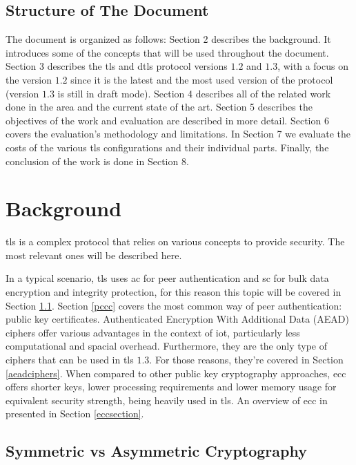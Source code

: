\documentclass{llncs}
\begin{document}
\subsection{Structure of The Document}

The document is organized as follows: Section 2 describes the background. It
introduces some of the concepts that will be used throughout
the document. Section 3 describes the \gls{tls} and \gls{dtls} protocol
versions $1.2$ and $1.3$, with a focus on the version $1.2$ since
it is the latest and the most used version of the protocol (version $1.3$ is still in
draft mode). Section 4 describes all of the related work done in the area and
the current state of the art. Section 5 describes the objectives of the work and evaluation 
are described in more detail. 
Section 6
covers the evaluation's methodology and limitations. In Section 7 we evaluate the costs of the various \gls{tls}
configurations and their individual parts. Finally, the conclusion of the work is done in Section 8.

\section{Background}

\gls{tls} is a complex protocol that relies on various concepts to provide
security. The most relevant ones will be described here.

In a typical scenario, \gls{tls} uses \gls{ac} for peer authentication and \gls{sc} for bulk data
encryption and integrity protection, for this reason this topic will be covered in Section \ref{sac}. Section \ref{pccc} covers the most common way of peer authentication: public key certificates. Authenticated Encryption With Additional Data (AEAD) ciphers offer various advantages in the
context of \gls{iot}, particularly less computational and spacial overhead.
Furthermore, they are the only type of ciphers that can be used in \gls{tls}
$1.3$. For those reasons, they're covered in Section \ref{aeadciphers}.
When compared to other public key cryptography approaches, \gls{ecc} offers shorter keys, lower processing requirements and lower memory usage for equivalent security strength, being heavily used
in \gls{tls}. An overview of \gls{ecc} in presented in Section \ref{eccsection}.


\subsection{Symmetric vs Asymmetric Cryptography} \label{sac}
\end{document}
